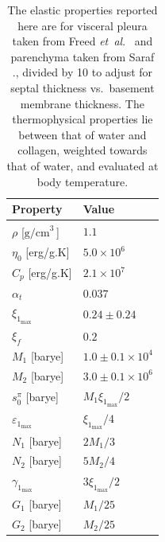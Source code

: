 \begin{table}
    \centering
    \begin{tabular}{|l|l|}
        \hline
        Property & Value \\ \hline
        $\rho$ \hfill [$\textrm{g/cm}^{3^{\phantom{|}}}$] & $1.1$ \\
        $\eta_0$ \hfill [erg/g.K] & $5.0 \times 10^6$ \\
        $C_p$ \hfill [erg/g.K] & $2.1 \times 10^7$ \\
        $\alpha_t$ & $0.037$ \\ \hline
        $\xi_{1_{\max}}$ & $0.24 \pm 0.24$ \\
        $\xi_f$ & $0.2$ \\
        $M_1$ \hfill [barye] & $1.0 \pm 0.1 \times 10^4$ \\
        $M_2$ \hfill [barye] & $3.0 \pm 0.1 \times 10^6$ \\
        $s^{\pi}_0$ \hfill [barye] & $M_1 \xi_{1_{\max}} / 2$ \\ \hline
        $\varepsilon_{1_{\max}}$ & $\xi_{1_{\max}} / 4$ \\
        $N_1$ \hfill [barye] & $2M_1/3$ \\
        $N_2$ \hfill [barye] & $5M_2/4$ \\ \hline
        $\gamma_{1_{\max}}$ & $3 \xi_{1_{\max}} / 2$ \\
        $G_1$ \hfill [barye] & $M_1 / 25$ \\
        $G_2$ \hfill [barye] & $M_2 / 25$ \\ \hline
    \end{tabular}
    \caption{The elastic properties reported here are for visceral pleura taken from Freed \textit{et~al}.\ \cite{Freedetal17} and parenchyma taken from Saraf ., \cite{Sarafetal07} divided by 10 to adjust for septal thickness vs.\ basement membrane thickness.  The thermo\-physical properties lie between that of water and collagen, weighted towards that of water, and evaluated at body temperature.}
    \label{tableVisceralPleura}
\end{table}

